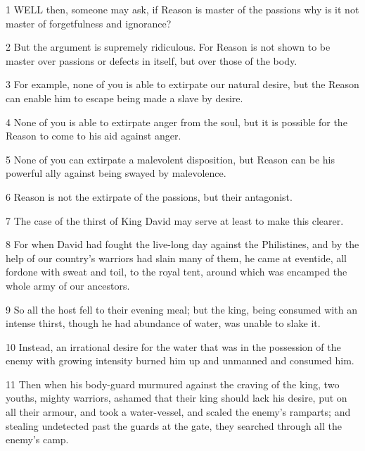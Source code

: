 \par 1 WELL then, someone may ask, if Reason is master of the passions why is it not master of forgetfulness and ignorance?

\par 2 But the argument is supremely ridiculous. For Reason is not shown to be master over passions or defects in itself, but over those of the body.

\par 3 For example, none of you is able to extirpate our natural desire, but the Reason can enable him to escape being made a slave by desire.

\par 4 None of you is able to extirpate anger from the soul, but it is possible for the Reason to come to his aid against anger.

\par 5 None of you can extirpate a malevolent disposition, but Reason can be his powerful ally against being swayed by malevolence.

\par 6 Reason is not the extirpate of the passions, but their antagonist.

\par 7 The case of the thirst of King David may serve at least to make this clearer.

\par 8 For when David had fought the live-long day against the Philistines, and by the help of our country's warriors had slain many of them, he came at eventide, all fordone with sweat and toil, to the royal tent, around which was encamped the whole army of our ancestors.

\par 9 So all the host fell to their evening meal; but the king, being consumed with an intense thirst, though he had abundance of water, was unable to slake it.

\par 10 Instead, an irrational desire for the water that was in the possession of the enemy with growing intensity burned him up and unmanned and consumed him.

\par 11 Then when his body-guard murmured against the craving of the king, two youths, mighty warriors, ashamed that their king should lack his desire, put on all their armour, and took a water-vessel, and scaled the enemy's ramparts; and stealing undetected past the guards at the gate, they searched through all the enemy's camp.

